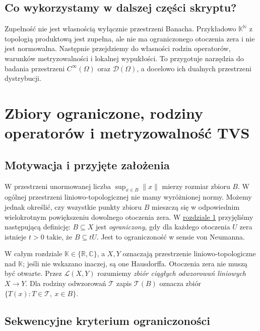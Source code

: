 \documentclass[11pt,a4paper]{article}
\numberwithin{equation}{section}
\theoremstyle{plain}
\theoremstyle{definition}
\theoremstyle{remark}
\newcommand{\R}{\mathbb R}
\newcommand{\C}{\mathbb C}
\newcommand{\N}{\mathbb N}
\newcommand{\K}{\mathbb K}
\begin{document}
\subsection{Co wykorzystamy w dalszej części skryptu?}

Zupełność nie jest własnością wyłącznie przestrzeni Banacha.
Przykładowo $\K^{\N}$ z topologią produktową jest zupełna,
ale nie ma ograniczonego otoczenia zera i nie jest normowalna.
Następnie przejdziemy do własności rodzin operatorów, warunków
metryzowalności i lokalnej wypukłości. To przygotuje narzędzia
do badania przestrzeni $C^\infty(\Omega)$ oraz $\mathcal D(\Omega)$,
a docelowo ich dualnych przestrzeni dystrybucji.


\setcounter{section}{3}
\section{Zbiory ograniczone, rodziny operatorów i metryzowalność TVS}\label{sec:rodziny-metryzowalnosc}

\subsection{Motywacja i przyjęte założenia}

W przestrzeni unormowanej liczba $\sup_{x\in B}\|x\|$ mierzy
rozmiar zbioru $B$. W ogólnej przestrzeni liniowo-topologicznej
nie mamy wyróżnionej normy. Możemy jednak określić, czy wszystkie
punkty zbioru $B$ mieszczą się w odpowiednim wielokrotnym
powiększeniu dowolnego otoczenia zera. W \hyperref[sec:tvs]{rozdziale 1} przyjęliśmy
następującą definicję: $B\subseteq X$ jest \emph{ograniczony}, gdy
dla każdego otoczenia $U$ zera istnieje $t>0$ takie, że
$B\subseteq tU$. Jest to ograniczoność w sensie von Neumanna.

W całym rozdziale $\K\in\{\R,\C\}$, a $X,Y$ oznaczają
przestrzenie liniowo-topologiczne nad $\K$; jeśli nie wskazano
inaczej, są one Hausdorffa. Otoczenia zera nie muszą być otwarte.
Przez $\mathcal L(X,Y)$ rozumiemy \emph{zbiór ciągłych odwzorowań
liniowych} $X\to Y$. Dla rodziny odwzorowań $\mathcal T$
zapis $\mathcal T(B)$ oznacza zbiór
$\{T(x):T\in\mathcal T,\ x\in B\}$.

\subsection{Sekwencyjne kryterium ograniczoności}
\end{document}
